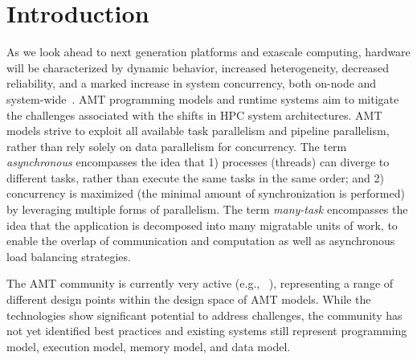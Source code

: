\chapter{Introduction}
\label{chap:introduction}
As we look ahead to next generation platforms and exascale computing,  hardware 
will be characterized by dynamic behavior, increased
heterogeneity, decreased reliability, and a marked increase in system
\gls{concurrency}, both on-node and system-wide~\cite{doe_arch, dav_exascale}. 
\gls{AMT} \glspl{programming model} and \glspl{runtime system} 
aim to mitigate the challenges associated with the shifts in \gls{HPC} system architectures.  
\gls{AMT} models strive to exploit all available \gls{task parallelism} and
\gls{pipeline parallelism}, rather than rely solely on \gls{data parallelism}
for \gls{concurrency}. The term {\em \gls{asynchronous}} encompasses the idea that 
1) processes (threads) can diverge to different tasks, rather than execute 
the same tasks in the same order; and 2) \gls{concurrency} is maximized (the 
  minimal amount of synchronization is performed) by 
leveraging multiple forms of parallelism. The term {\em many-task} encompasses 
the idea that the application is decomposed into many 
\gls{migratable} units of work, to enable the overlap of communication and 
computation as well as asynchronous load balancing strategies.

The \gls{AMT} community is currently very active (e.g.,
~\cite{OCR,STAPL,Legion,Realm,StencilHPX,Charm++,Uintah,Loci,PARSEC,DaGuE,Cilk}),
representing a range of different design points within the
design space of \gls{AMT} models. While the technologies show significant
potential to address challenges, the community has not yet identified best
practices and existing systems still represent \gls{programming model},
\gls{execution model}, \gls{memory model}, and \gls{data model}.  

